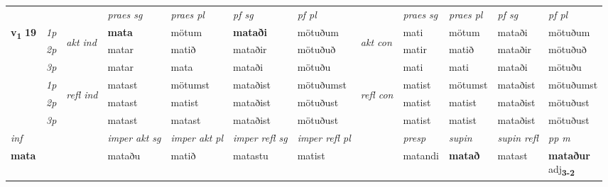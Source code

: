 \begin{longtable}[l]{X>{\footnotesize\itshape}llXXXXlXXXX}
\midrule

 & &   & \textit{praes sg}  & \textit{praes pl}    & \textit{ pf sg} & \textit{pf pl} & & \textit{praes sg}  & \textit{praes pl}    & \textit{pf sg} & \textit{pf pl }  \\ \cmidrule{4-7} \cmidrule{9-12}
 \multirow{2}{*}{{{\textbf{v{\textsubscript{1}}} \Large{\textbf{19}}}}}  & 1p & \multirow{3}{*}{\begin{turn}{90}\textit{akt ind}\end{turn}} & \textbf{mata} & mötum & \textbf{mataði} & mötuðum & \multirow{3}{*}{\begin{turn}{90}\textit{akt con}\end{turn}} &mati & mötum & mataði & mötuðum\\*
 & 2p &  &  matar  & matið & mataðir & mötuðuð & & matir & matið & mataðir & mötuðuð \\*
 & 3p &  & matar & mata & mataði & mötuðu & & mati & mati& mataði & mötuðu \\*
\cmidrule{4-7} \cmidrule{9-12}
 & 1p & \multirow{3}{*}{\begin{turn}{90}\textit{refl ind}\end{turn}}  & matast & mötumst & mataðist & mötuðumst & \multirow{3}{*}{\begin{turn}{90}\textit{refl con}\end{turn}}  &matist & mötumst & mataðist & mötuðumst \\*
 & 2p &  & matast & matist & mataðist & mötuðust & &matist & matist & mataðist & mötuðust \\*
 & 3p  & & matast & matast & mataðist & mötuðust & & matist & matist& mataðist & mötuðust \\*
\cmidrule{4-7} \cmidrule{9-12}

   {\textit{inf}} & &  & \textit{imper akt sg} & \textit{imper akt pl} & \textit{imper refl sg} & \textit{imper refl pl} && \textit{presp} & \textit{supin} & \textit{supin refl} & \textit{pp m} \\*
  {\textbf{mata}} & && mataðu  & matið & matastu & matist && matandi &  \textbf{matað} & matast & \specialcell{\textbf{mataður} \\ adj\textbf{\textsubscript{3-2}}} \\*

\midrule


\end{longtable}
